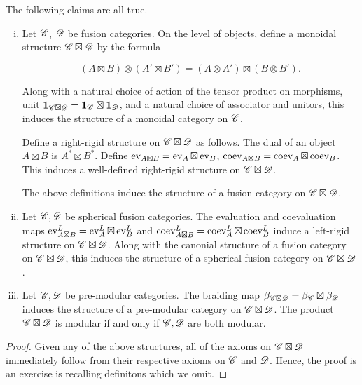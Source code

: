 \begin{proposition} The following claims are all true.

\begin{enumerate}[(i)]
\item Let $\mathscr{C}$, $\mathscr{D}$ be fusion categories. On the level of objects, define a monoidal structure $\mathscr{C}\boxtimes \mathscr{D}$ by the formula

$$(A\boxtimes B)\otimes (A'\boxtimes B')= (A\otimes A')\boxtimes (B\otimes B').$$

Along with a natural choice of action of the tensor product on morphisms, unit $\mathbf{1}_{\mathscr{C}\boxtimes \mathscr{D}}=\mathbf{1}_{\mathscr{C}}\boxtimes \mathbf{1}_{\mathscr{D}}$, and a natural choice of associator and unitors, this induces the structure of a monoidal category on $\mathscr{C}$.

Define a right-rigid structure on $\mathscr{C}\boxtimes \mathscr{D}$ as follows. The dual of an object $A\boxtimes B$ is $A^*\boxtimes B^*$. Define $\operatorname{ev}_{A\boxtimes B}=\operatorname{ev}_{A}\boxtimes \operatorname{ev}_{B}$, $\operatorname{coev}_{A\boxtimes B}= \operatorname{coev}_{A}\boxtimes \operatorname{coev}_{B}$. This induces a well-defined right-rigid structure on $\mathscr{C}\boxtimes \mathscr{D}$.

The above definitions induce the structure of a fusion category on $\mathscr{C}\boxtimes \mathscr{D}$. 

\item Let $\mathscr{C},\mathscr{D}$ be spherical fusion categories. The evaluation and coevaluation maps $\operatorname{ev}^{L}_{A\boxtimes B} = \operatorname{ev}^{L}_{A}\boxtimes \operatorname{ev}^{L}_B$ and $\operatorname{coev}^{L}_{A\boxtimes B}=\operatorname{coev}^{L}_{A}\boxtimes \operatorname{coev}^{L}_{B}$ induce a left-rigid structure on $\mathscr{C}\boxtimes \mathscr{D}$. Along with the canonial structure of a fusion category on $\mathscr{C}\boxtimes \mathscr{D}$, this induces the structure of a spherical fusion category on $\mathscr{C}\boxtimes \mathscr{D}$.

\item Let $\mathscr{C},\mathscr{D}$ be pre-modular categories. The braiding map $\beta_{\mathscr{C}\boxtimes \mathscr{D}}=\beta_{\mathscr{C}}\boxtimes \beta_{\mathscr{D}}$ induces the structure of a pre-modular category on $\mathscr{C}\boxtimes \mathscr{D}$. The product $\mathscr{C}\boxtimes \mathscr{D}$ is modular if and only if $\mathscr{C},\mathscr{D}$ are both modular.
\end{enumerate}
\end{proposition}
\begin{proof} Given any of the above structures, all of the axioms on $\mathscr{C}\boxtimes \mathscr{D}$ immediately follow from their respective axioms on $\mathscr{C}$ and $\mathscr{D}$. Hence, the proof is an exercise is recalling definitons which we omit.
\end{proof}


